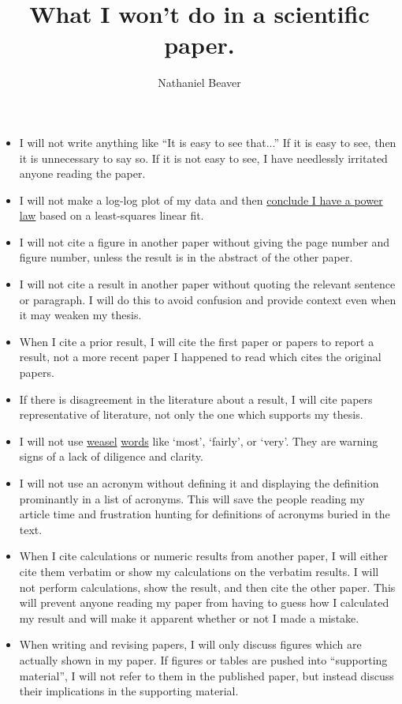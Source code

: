 \documentclass[12pt,letterpaper]{article}
\author{Nathaniel Beaver}
\title{What I won't do in a scientific paper.}
\begin{document}
\maketitle

\begin{itemize}
\item I will not write anything like ``It is easy to see that...'' If it is easy to see, then it is unnecessary to say so. If it is not easy to see, I have needlessly irritated anyone reading the paper.
\item I will not make a log-log plot of my data and then \href{http://vserver1.cscs.lsa.umich.edu/~crshalizi/notebooks/power-laws.html}{conclude I have a power law} based on a least-squares linear fit. 
\item I will not cite a figure in another paper without giving the page number and figure number, unless the result is in the abstract of the other paper.
\item I will not cite a result in another paper without quoting the relevant sentence or paragraph. I will do this to avoid confusion and provide context even when it may weaken my thesis.
\item When I cite a prior result, I will cite the first paper or papers to report a result, not a more recent paper I happened to read which cites the original papers.
\item If there is disagreement in the literature about a result, I will cite papers representative of literature, not only the one which supports my thesis.
\item I will not use \href{http://matt.might.net/articles/shell-scripts-for-passive-voice-weasel-words-duplicates/}{weasel} \href{http://en.wikipedia.org/wiki/Weasel_words}{words} like `most', `fairly', or `very'. They are warning signs of a lack of diligence and clarity.
\item I will not use an acronym without defining it and displaying the definition prominantly in a list of acronyms. This will save the people reading my article time and frustration hunting for definitions of acronyms buried in the text.
\item When I cite calculations or numeric results from another paper, I will either cite them verbatim or show my calculations on the verbatim results. I will not perform calculations, show the result, and then cite the other paper. This will prevent anyone reading my paper from having to guess how I calculated my result and will make it apparent whether or not I made a mistake.
\item When writing and revising papers, I will only discuss figures which are actually shown in my paper. If figures or tables are pushed into ``supporting material'', I will not refer to them in the published paper, but instead discuss their implications in the supporting material.
\end{itemize}
\end{document}

